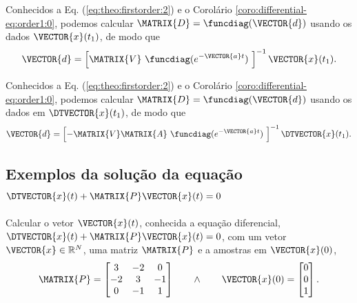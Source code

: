 \begin{corollary}
\label{coro:differential-eq:order1:1}
Conhecidos a Eq. (\ref{eq:theo:firstorder:2}) e o Corolário \ref{coro:differential-eq:order1:0},
podemos calcular
$\MATRIX{D}=\funcdiag(\VECTOR{d})$ 
usando os dados $\VECTOR{x}(t_1)$, de modo que
\begin{equation}\label{eq:coro:differential-eq:order1:1:a}
\VECTOR{d} =
\left[ \MATRIX{V}~\funcdiag(e^{-\VECTOR{a}t})~ \right]^{-1}
\VECTOR{x}(t_1).
\end{equation}
\end{corollary}

\begin{corollary}
\label{coro:differential-eq:order1:2}
Conhecidos a Eq. (\ref{eq:theo:firstorder:2}) e o Corolário \ref{coro:differential-eq:order1:0},
podemos calcular
$\MATRIX{D}=\funcdiag(\VECTOR{d})$ 
usando os dados em $\DTVECTOR{x}(t_1)$, de modo que
\begin{equation}\label{eq:coro:differential-eq:order1:1:b}
\VECTOR{d} =
\left[ -\MATRIX{V}\MATRIX{A}~\funcdiag(e^{-\VECTOR{a}t})~ \right]^{-1}
\DTVECTOR{x}(t_1).
\end{equation}
\end{corollary}

\subsection{Exemplos da solução da equação $\DTVECTOR{x}(t) + \MATRIX{P} \VECTOR{x}(t)=0$}

\begin{example}
\label{ex:dxPx:0}
Calcular o vetor $\VECTOR{x}(t)$,
conhecida a equação diferencial, $\DTVECTOR{x}(t) + \MATRIX{P} \VECTOR{x}(t)=0$, com 
um vetor $\VECTOR{x} \in \mathbb{R}^{N}$, uma matriz $\MATRIX{P}$ e a amostras em $\VECTOR{x}(0)$,
\begin{equation}
\MATRIX{P}=
\begin{bmatrix}
3 & -2 & 0\\
-2 & 3 & -1\\
0 & -1 & 1
\end{bmatrix}
\qquad \wedge \qquad
\VECTOR{x}(0)=
\begin{bmatrix}
0\\
0\\
1
\end{bmatrix}.
\end{equation}
\end{example}



